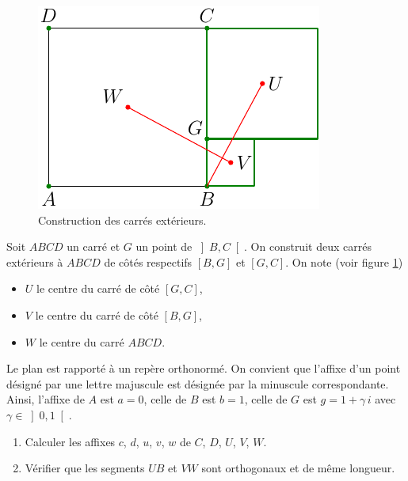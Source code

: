 \begin{figure}
 \centering
 \includegraphics{./Ecomp16_1.pdf}
 \caption{Construction des carrés extérieurs.}
 \label{fig:Ecomp16_1}
\end{figure}

Soit $ABCD$ un carré et $G$ un point de $\left] B, C \right[ $. On construit deux carrés extérieurs à $ABCD$ de côtés respectifs $\left[ B,G\right]$ et $\left[ G,C\right]$. On note (voir figure \ref{fig:Ecomp16_1})
\begin{itemize}
 \item $U$ le centre du carré de côté $\left[ G,C\right]$,
 \item $V$ le centre du carré de côté $\left[ B,G\right]$,
 \item $W$ le centre du carré $ABCD$. 
\end{itemize}
Le plan est rapporté à un repère orthonormé. On convient que l'affixe d'un point désigné par une lettre majuscule est désignée par la minuscule correspondante.\newline
Ainsi, l'affixe de $A$ est $a=0$, celle de $B$ est $b=1$, celle de $G$ est $g = 1 + \gamma \,i$ avec $\gamma \in \left]  0,1 \right[ $.
\begin{enumerate}
 \item Calculer les affixes $c$, $d$, $u$, $v$, $w$ de $C$, $D$, $U$, $V$, $W$.
 \item Vérifier que les segments $UB$ et $VW$ sont orthogonaux et de même longueur.
\end{enumerate}
